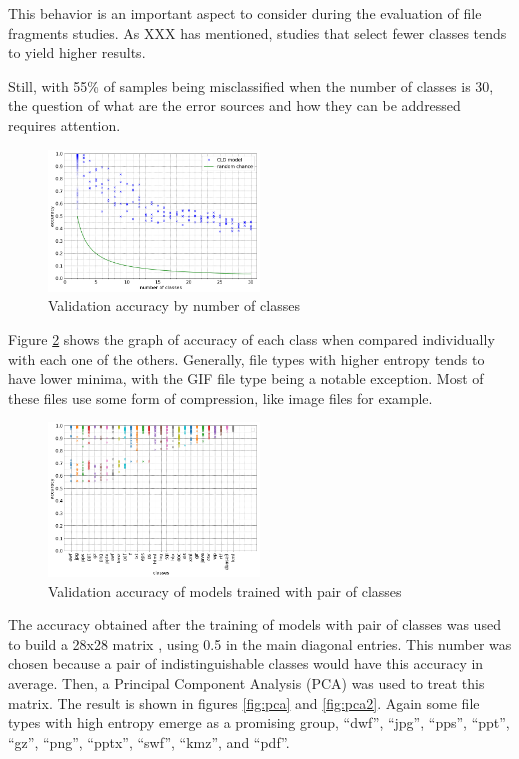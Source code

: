 This behavior is an important aspect to consider during the evaluation of file fragments studies. As XXX 
has mentioned, studies that select fewer classes tends to yield higher results. 

Still, with 55\% of samples being misclassified when the number of classes is 30, the question of what are the error sources and how they can be addressed requires attention.

\noindent
\begin{figure}[htb!]
\centering\includegraphics[width=0.50\textwidth]{content/nclasses.png}
\caption{\label{fig:nclasses}Validation accuracy by number of classes}%
\end{figure}


Figure \ref{fig:dual} shows the graph of accuracy of each class when compared individually with each one of the others. Generally, file types with higher entropy tends to have lower minima, with the GIF file type being a notable exception. Most of these files use some form of compression, like image files for example. 


\noindent
\begin{figure}[htb!]
\centering\includegraphics[width=0.50\textwidth]{content/dual.png}
\caption{\label{fig:dual}Validation accuracy of models trained with pair of classes}%
\end{figure}


The accuracy obtained after the training of models with pair of classes was used to build a 28x28 matrix , using 0.5 in the main diagonal entries. This number was chosen because a pair of indistinguishable classes would have this accuracy in average. Then, a Principal Component Analysis (PCA)  was used to treat this matrix. The result is shown in figures \ref{fig:pca} and \ref{fig:pca2}. Again some file types with high entropy emerge as a promising group, ``dwf'',
``jpg'',
``pps'',
``ppt'',
``gz'',
``png'',
``pptx'',
``swf'',
``kmz'',
and ``pdf''.

